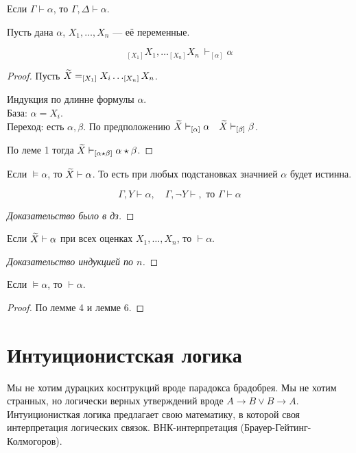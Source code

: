 \begin{lemma}
Если $\Gamma \vdash \alpha$, то $\Gamma, \Delta \vdash \alpha$.
\end{lemma}

\begin{lemma}
Пусть дана $\alpha$, $X_1,\ldots, X_n$ --- её переменные.

\[ _{[X_1]}X_1,\ldots _{[X_n]}X_n\ \vdash _{[\alpha]}\alpha  \]
\end{lemma}
\begin{proof}
    Пусть $\widetilde{X} = _{[X_1]} X_i \dots _{[X_n]} X_n$.

    Индукция по длинне формулы $\alpha$.\\
    База: $\alpha = X_i$.\\
    Переход: есть $\alpha, \beta$. По предположению $\widetilde{X} \vdash _{[\alpha]} \alpha ~~~ \widetilde{X} \vdash _{[\beta]} \beta$.

    По леме 1 тогда  $\widetilde{X} \vdash _{[\alpha \star \beta]} \alpha \star \beta$.
\end{proof}

\begin{lemma}
    Если $\vDash \alpha$, то $\widetilde{X} \vdash \alpha$.
    То есть при любых подстановках значнией $\alpha $ будет истинна.
\end{lemma}

\begin{lemma}
    \[ \Gamma, Y \vdash \alpha, \quad \Gamma, \neg Y \vdash, \text{ то } \Gamma \vdash \alpha \]
\end{lemma}
\begin{proof}[Доказательство было в дз]
\end{proof}

\begin{lemma}
    Если $\widetilde{X} \vdash \alpha$ при всех оценках $X_1, \dots, X_n$, то $\vdash \alpha$.
\end{lemma}
\begin{proof}
    [Доказательство индукцией по $n$]
\end{proof}
\begin{theorem}
    Если $\vDash \alpha$, то $\vdash \alpha$.
\end{theorem}
\begin{proof}
    По лемме 4 и лемме 6.
\end{proof}

\section{Интуиционистская логика}
Мы не хотим дурацких коснтрукций вроде парадокса брадобрея.
Мы не хотим странных, но логически верных утверждений вроде $A\to B \lor B \to A$.
Интуиционисткая логика предлагает свою математику, в которой своя интерпретация логических связок.
ВНК-интерпретация (Брауер-Гейтинг-Колмогоров).

